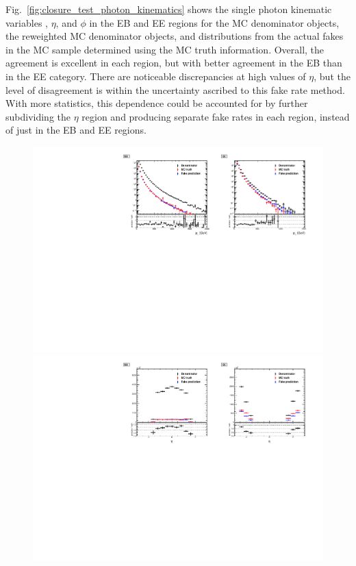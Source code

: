 Fig.~\ref{fig:closure_test_photon_kinematics} shows the single photon kinematic variables \pt, $\eta$, and $\phi$ in the EB and EE regions for the MC denominator objects, the reweighted MC denominator objects, and distributions from the actual fakes in the MC sample determined using the MC truth information. Overall, the agreement is excellent in each region, but with better agreement in the EB than in the EE category. There are noticeable discrepancies at high values of $\eta$, but the level of disagreement is within the uncertainty ascribed to this fake rate method. With more statistics, this dependence could be accounted for by further subdividing the $\eta$ region and producing separate fake rates in each region, instead of just in the EB and EE regions.

\begin{figure}[!htbp]
  \centering
  \includegraphics[scale=0.75]{figures/closure_test_photon_kinematics_pt.pdf}
  \includegraphics[scale=0.75]{figures/closure_test_photon_kinematics_eta.pdf}

\end{figure}
